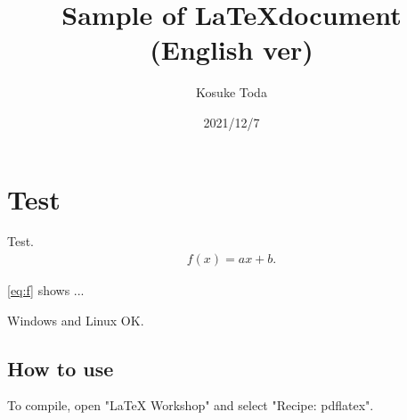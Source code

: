 \documentclass{article}
\begin{document}
    \title{Sample of \LaTeX document (English ver)}
    \author{Kosuke Toda}
    \date{2021/12/7}
    \maketitle

    \section{Test}
    Test.
    \begin{align}
        f(x) = ax + b. \label{eq:f}
    \end{align}
    
    \eqref{eq:f} shows ... 

    Windows and Linux OK.

    \subsection{How to use}
    To compile, open "LaTeX Workshop" and select "Recipe: pdflatex".
\end{document}
